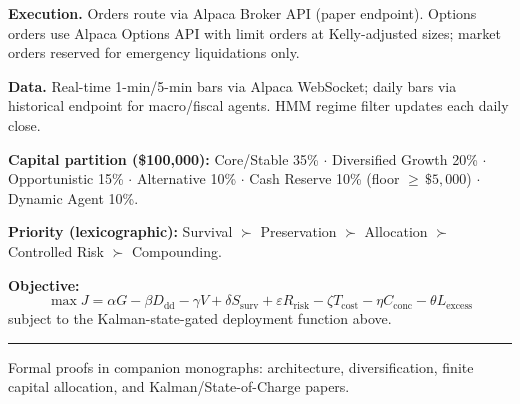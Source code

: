 \documentclass[7pt,letterpaper]{article}
\begin{document}
\textbf{Execution.} Orders route via Alpaca Broker API (paper endpoint). Options orders use Alpaca Options API with limit orders at Kelly-adjusted sizes; market orders reserved for emergency liquidations only.

\textbf{Data.} Real-time 1-min/5-min bars via Alpaca WebSocket; daily bars via historical endpoint for macro/fiscal agents. HMM regime filter updates each daily close.

\textbf{Capital partition (\$100{,}000):} Core/Stable 35\% $\cdot$ Diversified Growth 20\% $\cdot$ Opportunistic 15\% $\cdot$ Alternative 10\% $\cdot$ Cash Reserve 10\% (floor ${{\geq}}\,\$5{,}000$) $\cdot$ Dynamic Agent 10\%.

\textbf{Priority (lexicographic):} Survival $\succ$ Preservation $\succ$ Allocation $\succ$ Controlled Risk $\succ$ Compounding.

\textbf{Objective:}
\begin{equation}
  \max J = \alpha G - \beta D_{\text{dd}} - \gamma V + \delta S_{\text{surv}} + \varepsilon R_{\text{risk}} - \zeta T_{\text{cost}} - \eta C_{\text{conc}} - \theta L_{\text{excess}}
\end{equation}
subject to the Kalman-state-gated deployment function above.

\vspace{2pt}\hrule\vspace{2pt}
{\footnotesize Formal proofs in companion monographs: architecture, diversification, finite capital allocation, and Kalman/State-of-Charge papers.}
\end{document}

